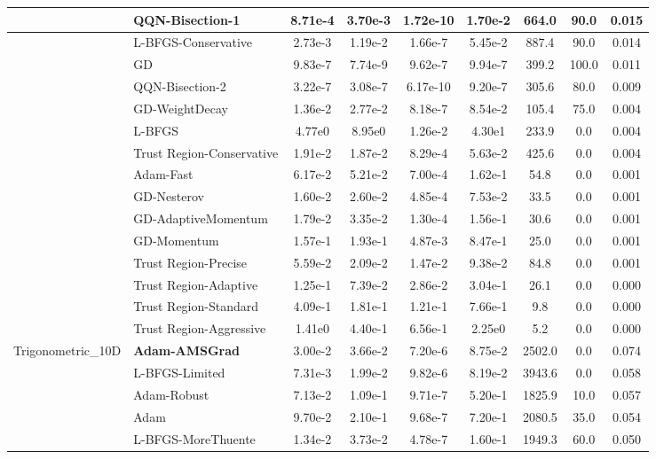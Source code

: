 \documentclass[10pt]{article}
\begin{document}
\begin{longtable}{|l|l|c|c|c|c|c|c|c|}
\hline
 & QQN-Bisection-1 & 8.71e-4 & 3.70e-3 & 1.72e-10 & 1.70e-2 & 664.0 & 90.0 & 0.015 \\
\hline
 & L-BFGS-Conservative & 2.73e-3 & 1.19e-2 & 1.66e-7 & 5.45e-2 & 887.4 & 90.0 & 0.014 \\
\hline
 & GD & 9.83e-7 & 7.74e-9 & 9.62e-7 & 9.94e-7 & 399.2 & 100.0 & 0.011 \\
\hline
 & QQN-Bisection-2 & 3.22e-7 & 3.08e-7 & 6.17e-10 & 9.20e-7 & 305.6 & 80.0 & 0.009 \\
\hline
 & GD-WeightDecay & 1.36e-2 & 2.77e-2 & 8.18e-7 & 8.54e-2 & 105.4 & 75.0 & 0.004 \\
\hline
 & L-BFGS & 4.77e0 & 8.95e0 & 1.26e-2 & 4.30e1 & 233.9 & 0.0 & 0.004 \\
\hline
 & Trust Region-Conservative & 1.91e-2 & 1.87e-2 & 8.29e-4 & 5.63e-2 & 425.6 & 0.0 & 0.004 \\
\hline
 & Adam-Fast & 6.17e-2 & 5.21e-2 & 7.00e-4 & 1.62e-1 & 54.8 & 0.0 & 0.001 \\
\hline
 & GD-Nesterov & 1.60e-2 & 2.60e-2 & 4.85e-4 & 7.53e-2 & 33.5 & 0.0 & 0.001 \\
\hline
 & GD-AdaptiveMomentum & 1.79e-2 & 3.35e-2 & 1.30e-4 & 1.56e-1 & 30.6 & 0.0 & 0.001 \\
\hline
 & GD-Momentum & 1.57e-1 & 1.93e-1 & 4.87e-3 & 8.47e-1 & 25.0 & 0.0 & 0.001 \\
\hline
 & Trust Region-Precise & 5.59e-2 & 2.09e-2 & 1.47e-2 & 9.38e-2 & 84.8 & 0.0 & 0.001 \\
\hline
 & Trust Region-Adaptive & 1.25e-1 & 7.39e-2 & 2.86e-2 & 3.04e-1 & 26.1 & 0.0 & 0.000 \\
\hline
 & Trust Region-Standard & 4.09e-1 & 1.81e-1 & 1.21e-1 & 7.66e-1 & 9.8 & 0.0 & 0.000 \\
\hline
 & Trust Region-Aggressive & 1.41e0 & 4.40e-1 & 6.56e-1 & 2.25e0 & 5.2 & 0.0 & 0.000 \\
Trigonometric\_10D & \textbf{Adam-AMSGrad} & 3.00e-2 & 3.66e-2 & 7.20e-6 & 8.75e-2 & 2502.0 & 0.0 & 0.074 \\
\hline
 & L-BFGS-Limited & 7.31e-3 & 1.99e-2 & 9.82e-6 & 8.19e-2 & 3943.6 & 0.0 & 0.058 \\
\hline
 & Adam-Robust & 7.13e-2 & 1.09e-1 & 9.71e-7 & 5.20e-1 & 1825.9 & 10.0 & 0.057 \\
\hline
 & Adam & 9.70e-2 & 2.10e-1 & 9.68e-7 & 7.20e-1 & 2080.5 & 35.0 & 0.054 \\
\hline
 & L-BFGS-MoreThuente & 1.34e-2 & 3.73e-2 & 4.78e-7 & 1.60e-1 & 1949.3 & 60.0 & 0.050 \\

\end{longtable}
\end{document}
